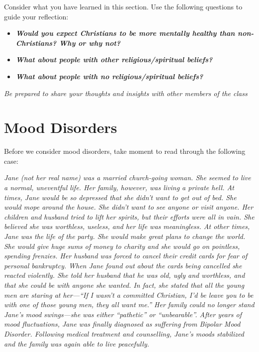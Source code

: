 \documentclass[
]{book}
\providecommand{\tightlist}{%
  \setlength{\itemsep}{0pt}\setlength{\parskip}{0pt}}
\begin{document}
\begin{reflect}
Consider what you have learned in this section. Use the following questions to guide your reflection:

\begin{itemize}
\tightlist
\item
  \textbf{\emph{Would you expect Christians to be more mentally healthy than non-Christians? Why or why not?}}\\
\item
  \textbf{\emph{What about people with other religious/spiritual beliefs?}}\\
\item
  \textbf{\emph{What about people with no religious/spiritual beliefs?}}
\end{itemize}

\emph{Be prepared to share your thoughts and insights with other members of the class}
\end{reflect}

\hypertarget{mood-disorders}{%
\section{Mood Disorders}\label{mood-disorders}}

Before we consider mood disorders, take moment to read through the following case:

\emph{Jane (not her real name) was a married church-going woman. She seemed to live a normal, uneventful life. Her family, however, was living a private hell. At times, Jane would be so depressed that she didn't want to get out of bed. She would mope around the house. She didn't want to see anyone or visit anyone. Her children and husband tried to lift her spirits, but their efforts were all in vain. She believed she was worthless, useless, and her life was meaningless. At other times, Jane was the life of the party. She would make great plans to change the world. She would give huge sums of money to charity and she would go on pointless, spending frenzies. Her husband was forced to cancel their credit cards for fear of personal bankruptcy. When Jane found out about the cards being cancelled she reacted violently. She told her husband that he was old, ugly and worthless, and that she could be with anyone she wanted. In fact, she stated that all the young men are staring at her---``If I wasn't a committed Christian, I'd be leave you to be with one of those young men, they all want me.'' Her family could no longer stand Jane's mood swings---she was either ``pathetic'' or ``unbearable''. After years of mood fluctuations, Jane was finally diagnosed as suffering from Bipolar Mood Disorder. Following medical treatment and counselling, Jane's moods stabilized and the family was again able to live peacefully.}
\end{document}
